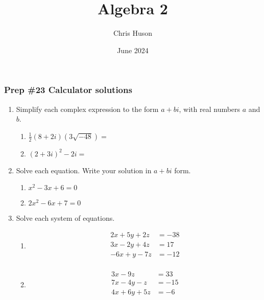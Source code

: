 \documentclass[12pt, twoside]{article}
\title{Algebra 2}
\author{Chris Huson}
\date{June 2024}
\begin{document}
\subsubsection*{Prep \#23 Calculator solutions}
\begin{enumerate}[itemsep=0.5cm]

\item Simplify each complex expression to the form $a+bi$, with real numbers $a$ and $b$.
\begin{multicols}{2}
\begin{enumerate}
    \item $\frac{1}{2}(8+2i)(3\sqrt{-48})=$
    \item $(2+3i)^2-2i=$
\end{enumerate}
\end{multicols} \vspace{4cm}

\item Solve each equation. Write your solution in $a+bi$ form.
\begin{multicols}{2}
\begin{enumerate}[itemsep=0.5cm]
    \item $x^2-3x+6=0$
    \item $2x^2-6x+7=0$
\end{enumerate}
\end{multicols} \vspace{4cm}

\item Solve each system of equations.
\begin{multicols}{2}
    \begin{enumerate}
        \item 
        \begin{align*}
            2x+5y +2z &= -38 \\
            3x-2y +4z &= 17 \\
            -6x +y -7z &= -12 \\
        \end{align*}
        \item 
        \begin{align*}
            3x -9z &= 33 \\
            7x-4y -z &= -15 \\
            4x+6y +5z &= -6 \\
        \end{align*}
    \end{enumerate}
\end{multicols}


\end{enumerate}
\end{document}
